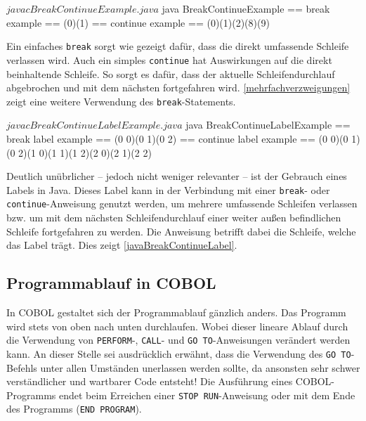 \sepCodeAndOutputCheck
\begin{shellwindow}
$ javac BreakContinueExample.java 
$ java BreakContinueExample
== break example == 
(0)(1)
== continue example == 
(0)(1)(2)(8)(9)
\end{shellwindow}

Ein einfaches \texttt{break} sorgt wie gezeigt dafür, dass die direkt umfassende Schleife verlassen wird. Auch ein simples \texttt{continue} hat Auswirkungen auf die direkt beinhaltende Schleife. So sorgt es dafür, dass der aktuelle Schleifendurchlauf abgebrochen und mit dem nächsten fortgefahren wird. \autoref{mehrfachverzweigungen} zeigt eine weitere Verwendung des \texttt{break}-Statements.

\sepCodeAndOutputCheck
\begin{shellwindow}
$ javac BreakContinueLabelExample.java 
$ java BreakContinueLabelExample
== break label example == 
(0 0)(0 1)(0 2)
== continue label example == 
(0 0)(0 1)(0 2)(1 0)(1 1)(1 2)(2 0)(2 1)(2 2)
\end{shellwindow}

Deutlich unübrlicher -- jedoch nicht weniger relevanter -- ist der Gebrauch eines Labels in Java. Dieses Label kann in der Verbindung mit einer \texttt{break}- oder \texttt{continue}-Anweisung genutzt werden, um mehrere umfassende Schleifen verlassen bzw. um mit dem nächsten Schleifendurchlauf einer weiter außen befindlichen Schleife fortgefahren zu werden. Die Anweisung betrifft dabei die Schleife, welche das Label trägt. Dies zeigt \autoref{javaBreakContinueLabel}.

\subsection*{Programmablauf in COBOL}

In COBOL gestaltet sich der Programmablauf gänzlich anders. Das Programm wird stets von oben nach unten durchlaufen. Wobei dieser lineare Ablauf durch die Verwendung von \texttt{PERFORM}-, \texttt{CALL}- und \texttt{GO TO}-Anweisungen verändert werden kann. An dieser Stelle sei ausdrücklich erwähnt, dass die Verwendung des \texttt{GO TO}-Befehls unter allen Umständen unerlassen werden sollte, da ansonsten sehr schwer verständlicher und wartbarer Code entsteht! Die Ausführung eines COBOL-Programms endet beim Erreichen einer \texttt{STOP RUN}-Anweisung oder mit dem Ende des Programms (\texttt{END PROGRAM}).\\

